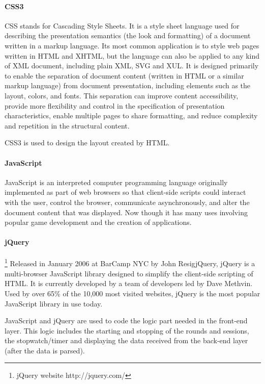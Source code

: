 \paragraph{CSS3}
CSS stands for Cascading Style Sheets. It is a style sheet language used for describing the presentation semantics (the look and formatting) of a document written in a markup language. Its most common application is to style web pages written in HTML and XHTML, but the language can also be applied to any kind of XML document, including plain XML, SVG and XUL. It is designed primarily to enable the separation of document content (written in HTML or a similar markup language) from document presentation, including elements such as the layout, colors, and fonts. This separation can improve content accessibility, provide more flexibility and control in the specification of presentation characteristics, enable multiple pages to share formatting, and reduce complexity and repetition in the structural content.

CSS3 is used to design the layout created by HTML.

\paragraph{JavaScript}
JavaScript is an interpreted computer programming language originally implemented as part of web browsers so that client-side scripts could interact with the user, control the browser, communicate asynchronously, and alter the document content that was displayed. Now though it has many uses involving popular game development and the creation of applications.

\paragraph{jQuery}\footnote{jQuery website http://jquery.com/}
Released in January 2006 at BarCamp NYC by John ResigjQuery, jQuery is a multi-browser JavaScript library designed to simplify the client-side scripting of HTML. It is currently developed by a team of developers led by Dave Methvin. Used by over 65\% of the 10,000 most visited websites, jQuery is the most popular JavaScript library in use today.

JavaScript and jQuery are used to code the logic part needed in the front-end layer. This logic includes the starting and stopping of the rounds and sessions, the stopwatch/timer and displaying the data received from the back-end layer (after the data is parsed).

